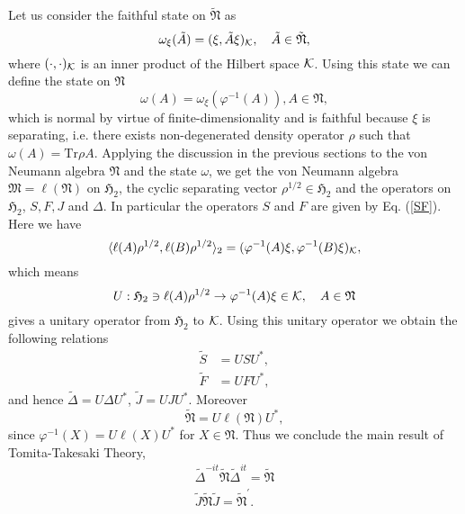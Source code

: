 Let us consider the faithful state on $\tilde{\mathfrak{N}}$ as
$$
\omega_\xi(\tilde{A})=(\xi,\tilde{A}\xi)_{\cal K},\quad \tilde{A}\in \tilde{\mathfrak{N}},
$$
where $(\cdot,\cdot)_{\cal K}$ is an inner product of the Hilbert space ${\cal K}$.
Using this state we can define the state on $\mathfrak{N}$
$$
\omega(A)=\omega_\xi(\varphi^{-1}(A)),A\in \mathfrak{N},
$$
which is normal by virtue of finite-dimensionality and is faithful because $\xi$ is separating, i.e. there exists non-degenerated density operator $\rho$ such that $\omega(A)=\mbox{Tr}\rho A$.
Applying the discussion in the previous sections to the von Neumann algebra $\mathfrak{N}$ and the state
$\omega$, we get
the von Neumann algebra $\mathfrak{M}=\ell (\mathfrak{N})$ on  
$\mathfrak{H}_2$, the cyclic separating vector $\rho^{1/2}\in \mathfrak{H}_2$
and the operators on $\mathfrak{H}_2$, $S, F, J$ and $\Delta$.
In particular the operators $S$ and $F$ are given by Eq. (\ref{SF}).
Here we have
$$
\langle \ell(A)\rho^{1/2},\ell( B)\rho^{1/2}\rangle_2=(\varphi^{-1}(A)\xi,\varphi^{-1}(B)\xi)_{\cal K},
$$
which means
$$
U:\mathfrak{H}_2\ni\ell(A)\rho^{1/2}\to \varphi^{-1}(A)\xi\in {\cal K}, \quad A\in \mathfrak{N}
$$
gives a unitary operator from $\mathfrak{H}_2$ to ${\cal K}$.
Using this unitary operator we obtain the following relations
\begin{equation}
\begin{split}
\tilde{S}&=US U^{\ast},\\
\tilde{F}&=UFU^\ast ,
\end{split}
\end{equation}
and hence $\tilde{\Delta}=U\Delta U^\ast$, $\tilde{J}=UJU^\ast$.
Moreover  
$$
\tilde{\mathfrak{N}}=U\ell(\mathfrak{N})U^\ast,
$$
since $\varphi^{-1}(X)=U\ell (X) U^\ast$ for $X\in \mathfrak{N}$.
Thus we conclude the main result of Tomita-Takesaki Theory,
\begin{equation}
\begin{split}
\tilde{\Delta}^{-it}\tilde{\mathfrak{N}}\tilde{\Delta}^{it}=\tilde{\mathfrak{N}}\\
\tilde{J}\tilde{\mathfrak{N}}\tilde{J}=\tilde{\mathfrak{N}}^\prime.
\end{split}
\end{equation}



